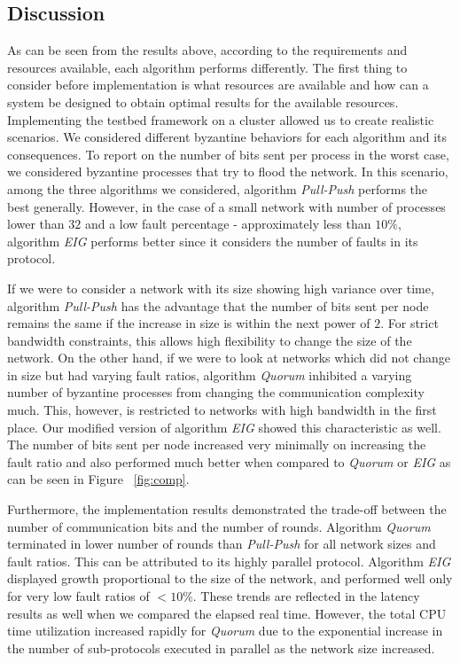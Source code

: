 ﻿
\subsection{Discussion}

As can be seen from the results above, according to the requirements and resources available, each algorithm performs differently. The first thing to consider before implementation is what resources are available and how can a system be designed to obtain optimal results for the available resources. Implementing the testbed framework on a cluster allowed us to create realistic scenarios. We considered different byzantine behaviors for each algorithm and its consequences. To report on the number of bits sent per process in the worst case, we considered byzantine processes that try to flood the network. In this scenario, among the three algorithms we considered, algorithm \textit{Pull-Push} performs the best generally. However, in the case of a small network with number of processes lower than $32$ and a low fault percentage - approximately less than $10\%$, algorithm \textit{EIG} performs better since it considers the number of faults in its protocol. 

If we were to consider a network with its size showing high variance over time, algorithm \textit{Pull-Push} has the advantage that the number of bits sent per node remains the same if the increase in size is within the next power of $2$. For strict bandwidth constraints, this allows high flexibility to change the size of the network. On the other hand, if we were to look at networks which did not change in size but had varying fault ratios, algorithm \textit{Quorum} inhibited a varying number of byzantine processes from changing the communication complexity much. This, however, is restricted to networks with high bandwidth in the first place. Our modified version of algorithm \textit{EIG} showed this characteristic as well. The number of bits sent per node increased very minimally on increasing the fault ratio and also performed much better when compared to \textit{Quorum} or \textit{EIG} as can be seen in Figure ~\ref{fig:comp}.

Furthermore, the implementation results demonstrated the trade-off between the number of communication bits and the number of rounds. Algorithm \textit{Quorum} terminated in lower number of rounds than \textit{Pull-Push} for all network sizes and fault ratios. This can be attributed to its highly parallel protocol. Algorithm \textit{EIG} displayed growth proportional to the size of the network, and performed well only for very low fault ratios of $<10\%$. These trends are reflected in the latency results as well when we compared the elapsed real time. However, the total CPU time utilization increased rapidly for \textit{Quorum} due to the exponential increase in the number of sub-protocols executed in parallel as the network size increased.

